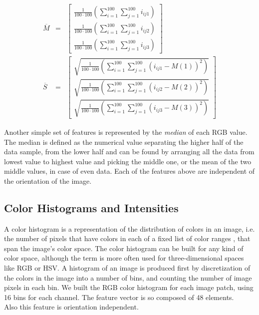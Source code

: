 \begin{eqnarray}
 \overline{M} & = & \left[ \begin{array}{c}
                            \frac{1}{100\cdot100} \left( \sum_{i=1}^{100} \sum_{j=1}^{100} i_{ij1} \right) \\
                            \frac{1}{100\cdot100} \left( \sum_{i=1}^{100} \sum_{j=1}^{100} i_{ij2} \right) \\
                            \frac{1}{100\cdot100} \left( \sum_{i=1}^{100} \sum_{j=1}^{100} i_{ij3} \right)
                           \end{array} \right] \\
 \overline{S} & = & \left[ \begin{array}{c}
                                 \sqrt{\frac{1}{100\cdot100} \left( \sum_{i=1}^{100} \sum_{j=1}^{100} (i_{ij1} - M(1) )^2 \right)} \\
                                 \sqrt{\frac{1}{100\cdot100} \left( \sum_{i=1}^{100} \sum_{j=1}^{100} (i_{ij2} - M(2) )^2 \right)} \\
                                 \sqrt{\frac{1}{100\cdot100} \left( \sum_{i=1}^{100} \sum_{j=1}^{100} (i_{ij3} - M(3) )^2 \right)}
                                \end{array}  \right]
\end{eqnarray}

Another simple set of features is represented by the \textit{median} of each \Gls{RGB} value. The median is defined as the numerical value separating the higher half of the data sample, from the lower half
and can be found by arranging all the data from lowest value to highest value and picking the middle one, or the mean of the two middle values, in case of even data.
Each of the features above are independent of the orientation of the image.



\vspace{0.5cm}

\subsection{Color Histograms and Intensities}
\label{ch4:chi}

A color histogram is a representation of the distribution of colors in an image, i.e. the number of pixels that have colors in each of a fixed list of color ranges \cite{colorHistogram01},
that span the image's color space. The color histogram can be built for any kind of color space, although the term is more often used for three-dimensional spaces like \Gls{RGB} or \Gls{HSV}.
A histogram of an image is produced first by discretization of the colors in the image into a number of bins, and counting the number of image pixels in each bin.
We built the \Gls{RGB} color histogram for each image patch, using 16 bins for each channel. The feature vector is so composed of 48 elements.\\
Also this feature is orientation independent.


